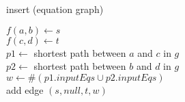 \begin{algorithm}[h]
\caption[.]{insert (equation graph)}
	
	{
		$f(a,b) \leftarrow s$ \\
		$f(c,d) \leftarrow t$ \\
		$p1 \leftarrow $ shortest path between $a$ and $c$ in $g$ \\
		$p2 \leftarrow $ shortest path between $b$ and $d$ in $g$ \\
		$w \leftarrow \#(p1.inputEqs \cup p2.inputEqs) $ \\
		add edge $(s,null,t,w)$ %
	}
  
  \label{algo:insert_dij}
\end{algorithm}

